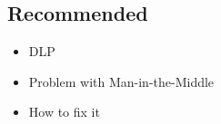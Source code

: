 
\subsection{Recommended}
\begin{itemize}
\item DLP
\item Problem with Man-in-the-Middle
\item How to fix it
\end{itemize}
